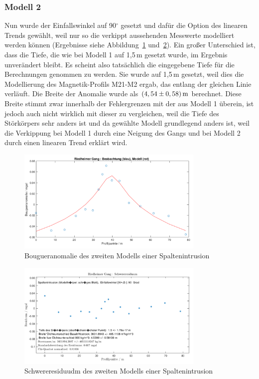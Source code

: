 \subsubsection{Modell 2}

Nun wurde der Einfallswinkel auf 90$^\circ$ gesetzt und dafür die Option des linearen Trends gewählt, weil nur so die verkippt aussehenden Messwerte modelliert werden können (Ergebnisse siehe Abbildung~\ref{fig:modell2} und~\ref{fig:modell2_res}). Ein großer Unterschied ist, dass die Tiefe, die wie bei Modell 1 auf 1,5\,m gesetzt wurde, im Ergebnis unverändert bleibt. Es scheint also tatsächlich die eingegebene Tiefe für die Berechnungen genommen zu werden. Sie wurde auf 1,5\,m gesetzt, weil dies die Modellierung des Magnetik-Profils M21-M2 ergab, das entlang der gleichen Linie verläuft. Die Breite der Anomalie wurde als $(4,54\pm0,58)\,\mathrm{m}$ berechnet. Diese Breite stimmt zwar innerhalb der Fehlergrenzen mit der aus Modell 1 überein, ist jedoch auch nicht wirklich mit dieser zu vergleichen, weil die Tiefe des Störkörpers sehr anders ist und da gewählte Modell grundlegend anders ist, weil die Verkippung bei Modell 1 durch eine Neigung des Gangs und bei Modell 2 durch einen linearen Trend erklärt wird.

\begin{figure}[!ht]
 \centering
 \includegraphics[width=0.8\textwidth]{fig/modell2}
 \caption{Bougueranomalie des zweiten Modells einer Spaltenintrusion}
 \label{fig:modell2}
\end{figure}

\begin{figure}[!ht]
 \centering
 \includegraphics[width=0.8\textwidth]{fig/modell2_res}
 \caption{Schwereresiduudm des zweiten Modells einer Spaltenintrusion}
 \label{fig:modell2_res}
\end{figure}

